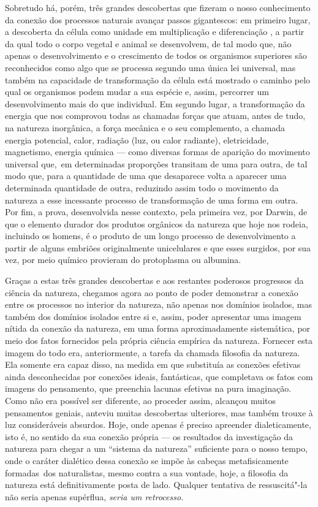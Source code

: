 Sobretudo há, porém, três grandes descobertas que fizeram o nosso
conhecimento da conexão dos processos naturais avançar passos
gigantescos: em primeiro lugar, a descoberta da célula como unidade em
multiplicação \textbar{} e diferenciação \textbar{}, a partir da qual todo o corpo vegetal
e animal se desenvolvem, de tal modo que, não apenas o desenvolvimento e
o crescimento de todos os organismos superiores são reconhecidos como
algo que se processa segundo uma única lei universal, \textbar{} mas também na
capacidade de transformação da célula está mostrado o caminho pelo qual
os organismos podem mudar a sua espécie e, assim, percorrer um
desenvolvimento mais do que individual. Em segundo lugar, \textbar{} a
transformação da energia que nos comprovou todas as chamadas forças que
atuam, antes de tudo, na natureza inorgânica, a força mecânica e o seu
complemento, a chamada energia potencial, calor, radiação (luz, ou calor
radiante), eletricidade, magnetismo, energia química --- como diversas
formas de aparição do movimento universal que,\est\ em determinadas
proporções transitam 
de uma para outra, de tal modo que, para a quantidade de uma que
desaparece volta a aparecer uma determinada quantidade de outra,
reduzindo assim todo o movimento da natureza a esse incessante processo
de transformação de uma forma em outra. Por fim, a prova, desenvolvida
nesse contexto, pela primeira vez,
por Darwin,
de que o elemento durador dos produtos orgânicos da 
natureza que hoje nos rodeia, incluindo os homens, é o produto de um
longo processo de desenvolvimento a partir de alguns embriões
originalmente unicelulares e que esses surgidos, por sua vez, por meio
químico provieram do protoplasma ou albumina.

Graças a estas três grandes descobertas e aos restantes poderosos
progressos da ciência da natureza, chegamos agora ao ponto de poder
demonstrar a conexão entre os processos no interior da natureza, não
apenas nos domínios isolados, mas também dos domínios isolados entre si
e, assim, poder apresentar uma imagem nítida da conexão da natureza, em
uma forma aproximadamente sistemática, por meio dos fatos fornecidos
pela própria ciência empírica da natureza. Fornecer esta imagem do todo
era, anteriormente, a tarefa da chamada filosofia da natureza. Ela
somente era capaz disso, na medida em que substituía as conexões
efetivas ainda desconhecidas por conexões ideais, fantásticas, que
completava os fatos com imagens do pensamento, que preenchia lacunas
efetivas na pura imaginação. Como não era possível ser diferente, ao
proceder assim, alcançou muitos pensamentos geniais, anteviu muitas
descobertas ulteriores, mas também trouxe à luz consideráveis absurdos.
Hoje, onde apenas é preciso apreender dialeticamente, isto é, no sentido
da sua conexão própria --- os resultados da investigação da natureza para
chegar a um ``sistema da natureza'' suficiente para o nosso tempo, onde
o caráter dialético dessa conexão se impõe às cabeças metafisicamente
formadas\est\ dos naturalistas, mesmo contra a sua vontade, hoje, a filosofia
da natureza está definitivamente posta de lado. Qualquer tentativa de
ressuscitá"-la não seria apenas supérflua, \emph{seria um retrocesso.}

